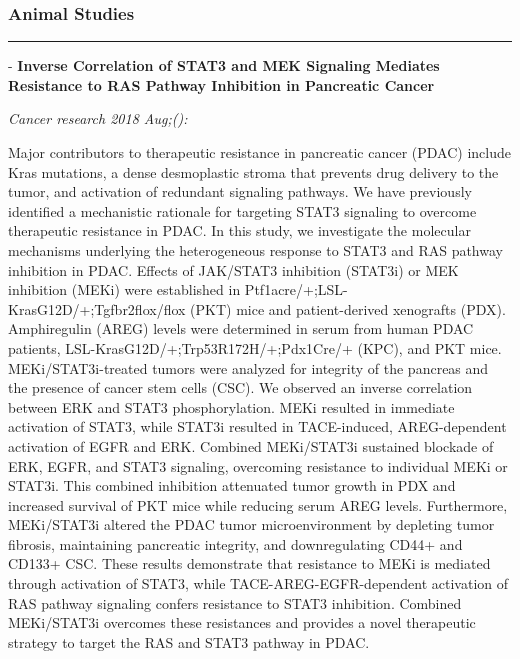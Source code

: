 \documentclass[]{article}
\begin{document}
\hypertarget{animal-studies}{%
\subsubsection{Animal Studies}\label{animal-studies}}

\begin{center}\rule{0.5\linewidth}{\linethickness}\end{center}

 - \textbf{Inverse Correlation of STAT3 and MEK Signaling Mediates
Resistance to RAS Pathway Inhibition in Pancreatic Cancer}

\emph{Cancer research 2018 Aug;():}

Major contributors to therapeutic resistance in pancreatic cancer (PDAC)
include Kras mutations, a dense desmoplastic stroma that prevents drug
delivery to the tumor, and activation of redundant signaling pathways.
We have previously identified a mechanistic rationale for targeting
STAT3 signaling to overcome therapeutic resistance in PDAC. In this
study, we investigate the molecular mechanisms underlying the
heterogeneous response to STAT3 and RAS pathway inhibition in PDAC.
Effects of JAK/STAT3 inhibition (STAT3i) or MEK inhibition (MEKi) were
established in Ptf1acre/+;LSL-KrasG12D/+;Tgfbr2flox/flox (PKT) mice and
patient-derived xenografts (PDX). Amphiregulin (AREG) levels were
determined in serum from human PDAC patients,
LSL-KrasG12D/+;Trp53R172H/+;Pdx1Cre/+ (KPC), and PKT mice.
MEKi/STAT3i-treated tumors were analyzed for integrity of the pancreas
and the presence of cancer stem cells (CSC). We observed an inverse
correlation between ERK and STAT3 phosphorylation. MEKi resulted in
immediate activation of STAT3, while STAT3i resulted in TACE-induced,
AREG-dependent activation of EGFR and ERK. Combined MEKi/STAT3i
sustained blockade of ERK, EGFR, and STAT3 signaling, overcoming
resistance to individual MEKi or STAT3i. This combined inhibition
attenuated tumor growth in PDX and increased survival of PKT mice while
reducing serum AREG levels. Furthermore, MEKi/STAT3i altered the PDAC
tumor microenvironment by depleting tumor fibrosis, maintaining
pancreatic integrity, and downregulating CD44+ and CD133+ CSC. These
results demonstrate that resistance to MEKi is mediated through
activation of STAT3, while TACE-AREG-EGFR-dependent activation of RAS
pathway signaling confers resistance to STAT3 inhibition. Combined
MEKi/STAT3i overcomes these resistances and provides a novel therapeutic
strategy to target the RAS and STAT3 pathway in PDAC.
\end{document}
